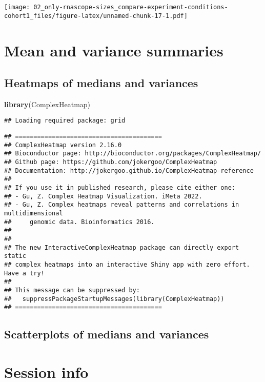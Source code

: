 \documentclass[
]{article}
\newenvironment{Shaded}{\begin{snugshade}}{\end{snugshade}}
\newcommand{\FunctionTok}[1]{\textcolor[rgb]{0.13,0.29,0.53}{\textbf{#1}}}
\newcommand{\NormalTok}[1]{#1}
\begin{document}
\texttt{[image: 02\_only-rnascope-sizes\_compare-experiment-conditions-cohort1\_files/figure-latex/unnamed-chunk-17-1.pdf]}

\hypertarget{mean-and-variance-summaries}{%
\section{Mean and variance
summaries}\label{mean-and-variance-summaries}}

\hypertarget{heatmaps-of-medians-and-variances}{%
\subsection{Heatmaps of medians and
variances}\label{heatmaps-of-medians-and-variances}}

\begin{Shaded}
\begin{Highlighting}[]
\FunctionTok{library}\NormalTok{(ComplexHeatmap)}
\end{Highlighting}
\end{Shaded}

\begin{verbatim}
## Loading required package: grid
\end{verbatim}

\begin{verbatim}
## ========================================
## ComplexHeatmap version 2.16.0
## Bioconductor page: http://bioconductor.org/packages/ComplexHeatmap/
## Github page: https://github.com/jokergoo/ComplexHeatmap
## Documentation: http://jokergoo.github.io/ComplexHeatmap-reference
## 
## If you use it in published research, please cite either one:
## - Gu, Z. Complex Heatmap Visualization. iMeta 2022.
## - Gu, Z. Complex heatmaps reveal patterns and correlations in multidimensional 
##     genomic data. Bioinformatics 2016.
## 
## 
## The new InteractiveComplexHeatmap package can directly export static 
## complex heatmaps into an interactive Shiny app with zero effort. Have a try!
## 
## This message can be suppressed by:
##   suppressPackageStartupMessages(library(ComplexHeatmap))
## ========================================
\end{verbatim}

\hypertarget{scatterplots-of-medians-and-variances}{%
\subsection{Scatterplots of medians and
variances}\label{scatterplots-of-medians-and-variances}}

\hypertarget{session-info}{%
\section{Session info}\label{session-info}}
\end{document}

